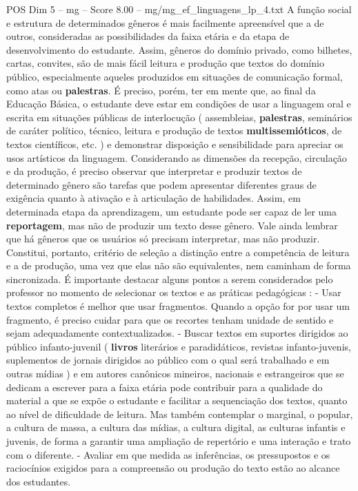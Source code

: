 \begin{textsample}{POS Dim 5 – mg – Score 8.00 – mg/mg\_ef\_linguagens\_lp\_4.txt}
A função social e estrutura de determinados gêneros é mais facilmente apreensível que a de outros, consideradas as possibilidades da faixa etária e da etapa de desenvolvimento do estudante.
Assim, gêneros do domínio privado, como bilhetes, cartas, convites, são de mais fácil leitura e produção que textos do domínio público, especialmente aqueles produzidos em situações de comunicação formal, como atas ou \textbf{palestras}.
É preciso, porém, ter em mente que, ao final da Educação Básica, o estudante deve estar em condições de usar a linguagem oral e escrita em situações públicas de interlocução ( assembleias, \textbf{palestras}, seminários de caráter político, técnico, leitura e produção de textos \textbf{multissemióticos}, de textos científicos, etc. ) e demonstrar disposição e sensibilidade para apreciar os usos artísticos da linguagem.
Considerando as dimensões da recepção, circulação e da produção, é preciso observar que interpretar e produzir textos de determinado gênero são tarefas que podem apresentar diferentes graus de exigência quanto à ativação e à articulação de habilidades.
Assim, em determinada etapa da aprendizagem, um estudante pode ser capaz de ler uma \textbf{reportagem}, mas não de produzir um texto desse gênero.
Vale ainda lembrar que há gêneros que os usuários só precisam interpretar, mas não produzir.
Constitui, portanto, critério de seleção a distinção entre a competência de leitura e a de produção, uma vez que elas não são equivalentes, nem caminham de forma sincronizada.
É importante destacar alguns pontos a serem considerados pelo professor no momento de selecionar os textos e as práticas pedagógicas : - Usar textos completos é melhor que usar fragmentos.
Quando a opção for por usar um fragmento, é preciso cuidar para que os recortes tenham unidade de sentido e sejam adequadamente contextualizados. - Buscar textos em suportes dirigidos ao público infanto-juvenil ( \textbf{livros} literários e paradidáticos, revistas infanto-juvenis, suplementos de jornais dirigidos ao público com o qual será trabalhado e em outras mídias ) e em autores canônicos mineiros, nacionais e estrangeiros que se dedicam a escrever para a faixa etária pode contribuir para a qualidade do material a que se expõe o estudante e facilitar a sequenciação dos textos, quanto ao nível de dificuldade de leitura.
Mas também contemplar o marginal, o popular, a cultura de massa, a cultura das mídias, a cultura digital, as culturas infantis e juvenis, de forma a garantir uma ampliação de repertório e uma interação e trato com o diferente. - Avaliar em que medida as inferências, os pressupostos e os raciocínios exigidos para a compreensão ou produção do texto estão ao alcance dos estudantes.

\end{textsample}

